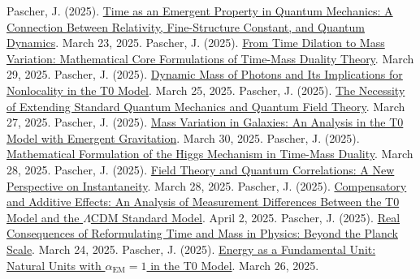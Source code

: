 \documentclass[a4paper,12pt]{article}
\newcommand{\alphaEM}{\alpha_{\text{EM}}}
\begin{document}
	\begin{thebibliography}{99}
		 Pascher, J. (2025). \href{https://github.com/jpascher/T0-Time-Mass-Duality/tree/main/2/pdf/English/ZeitEmergentQMEn.pdf}{Time as an Emergent Property in Quantum Mechanics: A Connection Between Relativity, Fine-Structure Constant, and Quantum Dynamics}. March 23, 2025.
		 Pascher, J. (2025). \href{https://github.com/jpascher/T0-Time-Mass-Duality/tree/main/2/pdf/English/MathZeitMasseLagrangeEn.pdf}{From Time Dilation to Mass Variation: Mathematical Core Formulations of Time-Mass Duality Theory}. March 29, 2025.
		 Pascher, J. (2025). \href{https://github.com/jpascher/T0-Time-Mass-Duality/tree/main/2/pdf/English/DynMassePhotonenNichtlokalEn.pdf}{Dynamic Mass of Photons and Its Implications for Nonlocality in the T0 Model}. March 25, 2025.
		 Pascher, J. (2025). \href{https://github.com/jpascher/T0-Time-Mass-Duality/tree/main/2/pdf/English/NotwendigkeitQMErweiterungEn.pdf}{The Necessity of Extending Standard Quantum Mechanics and Quantum Field Theory}. March 27, 2025.
		 Pascher, J. (2025). \href{https://github.com/jpascher/T0-Time-Mass-Duality/tree/main/2/pdf/English/MassVarGalaxienEn.pdf}{Mass Variation in Galaxies: An Analysis in the T0 Model with Emergent Gravitation}. March 30, 2025.
		 Pascher, J. (2025). \href{https://github.com/jpascher/T0-Time-Mass-Duality/tree/main/2/pdf/English/MathHiggsZeitMasseEn.pdf}{Mathematical Formulation of the Higgs Mechanism in Time-Mass Duality}. March 28, 2025.
		 Pascher, J. (2025). \href{https://github.com/jpascher/T0-Time-Mass-Duality/tree/main/2/pdf/English/FeldtheorieQuantenEn.pdf}{Field Theory and Quantum Correlations: A New Perspective on Instantaneity}. March 28, 2025.
		 Pascher, J. (2025). \href{https://github.com/jpascher/T0-Time-Mass-Duality/tree/main/2/pdf/English/MessdifferenzenT0StandardEn.pdf}{Compensatory and Additive Effects: An Analysis of Measurement Differences Between the T0 Model and the \(\Lambda\)CDM Standard Model}. April 2, 2025.
		 Pascher, J. (2025). \href{https://github.com/jpascher/T0-Time-Mass-Duality/tree/main/2/pdf/English/JenseitsPlanckEn.pdf}{Real Consequences of Reformulating Time and Mass in Physics: Beyond the Planck Scale}. March 24, 2025.
		 Pascher, J. (2025). \href{https://github.com/jpascher/T0-Time-Mass-Duality/tree/main/2/pdf/English/NatEinheitenAlpha1En.pdf}{Energy as a Fundamental Unit: Natural Units with \(\alphaEM = 1\) in the T0 Model}. March 26, 2025.

\end{thebibliography}
\end{document}
